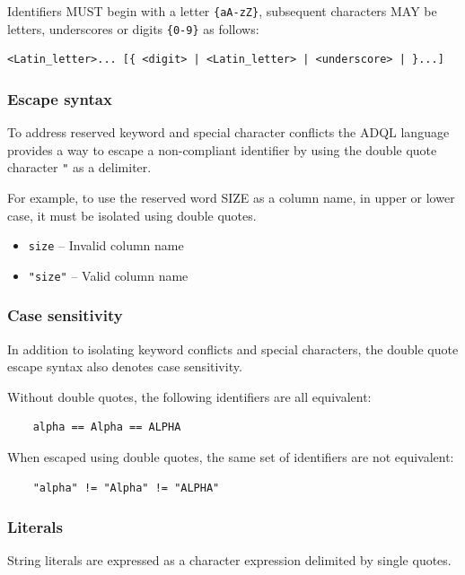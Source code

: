 \documentclass[11pt,a4paper]{ivoa}
\begin{document}
Identifiers MUST begin with a letter
\verb:{aA-zZ}:, subsequent characters MAY be letters, underscores or
digits \verb:{0-9}: as follows:

\begin{verbatim}
<Latin_letter>... [{ <digit> | <Latin_letter> | <underscore> | }...]
\end{verbatim}

\subsubsection{Escape syntax}
\label{sec:adql.escape}

To address reserved keyword and special character conflicts the ADQL language
provides a way to escape a non-compliant identifier by using the double
quote character \verb:": as a delimiter.

For example, to use the reserved word SIZE as a column name, in upper or lower case,
it must be isolated using double quotes.

\begin{itemize}
    \item \verb:size: -- Invalid column name
    \item \verb:"size": -- Valid column name
\end{itemize}

\subsubsection{Case sensitivity}
\label{sec:adql.case}

In addition to isolating keyword conflicts and special characters,
the double quote escape syntax also denotes case sensitivity.

Without double quotes, the following identifiers are all equivalent:
\begin{verbatim}
    alpha == Alpha == ALPHA
\end{verbatim}

When escaped using double quotes, the same set of identifiers are not equivalent:
\begin{verbatim}
    "alpha" != "Alpha" != "ALPHA"
\end{verbatim}

\subsubsection{Literals}
\label{sec:literals}

String literals are expressed as a character expression delimited by single quotes.
\end{document}
